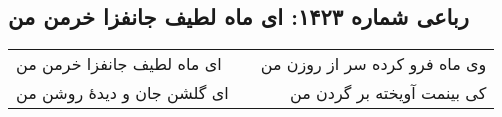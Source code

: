 \begin{center}
\section*{رباعی شماره ۱۴۲۳: ای ماه لطیف جانفزا خرمن من}
\label{sec:1423}
\begin{longtable}{l p{0.5cm} r}
ای ماه لطیف جانفزا خرمن من
&&
وی ماه فرو کرده سر از روزن من
\\
ای گلشن جان و دیدهٔ روشن من
&&
کی بینمت آویخته بر گردن من
\\
\end{longtable}
\end{center}
